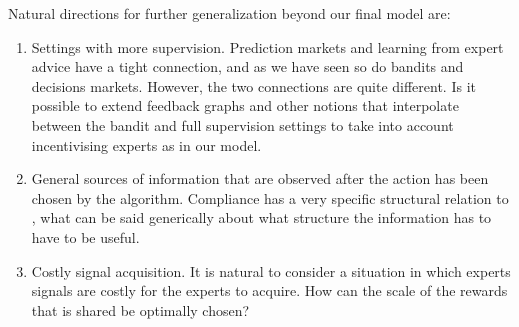 Natural directions for further generalization beyond our final model are:

\begin{enumerate}

\item Settings with more supervision. Prediction markets and learning from expert advice have a tight connection, and as we have seen so do bandits and decisions markets. However, the two connections are quite different. Is it possible to extend feedback graphs and other notions that interpolate between the bandit and full supervision settings to take into account incentivising experts as in our model. 

\item General sources of information that are observed after the action has been chosen by the algorithm. Compliance has a very specific structural relation to , what can be said generically about what structure the information has to have to be useful.

\item Costly signal acquisition. It is natural to consider a situation in which experts signals are costly for the experts to acquire. How can the scale of the rewards that is shared be optimally chosen?

\end{enumerate}





